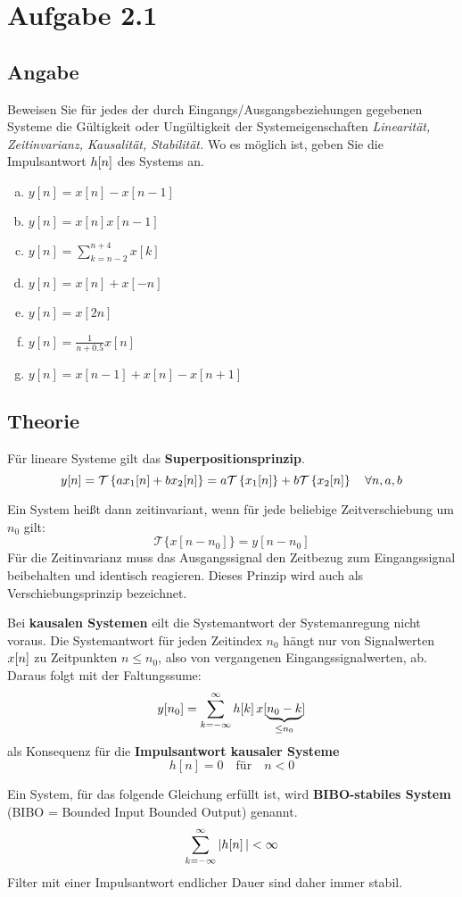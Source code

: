 \section*{Aufgabe 2.1}
\subsection*{Angabe}
Beweisen Sie für jedes der durch Eingangs/Ausgangsbeziehungen gegebenen Systeme die Gültigkeit oder Ungültigkeit der Systemeigenschaften \textit{Linearität, Zeitinvarianz, Kausalität, Stabilität.} Wo es möglich ist, geben Sie die Impulsantwort $h\negthinspace\left[n\right]$ des Systems an.
\begin{enumerate}[a)]
	\item $y[n] = x[n]-x[n-1]$
	\item $y[n] = x[n]x[n-1]$
	\item $\displaystyle{y[n] = \sum_{k=n-2}^{n+4}x[k]}$
	\item $y[n] = x[n] + x[-n]$
	\item $y[n] = x[2n]$
	\item $y[n] = \frac{1}{n+0.5}x[n]$
	\item $y[n] = x[n-1]+x[n]-x[n+1]$
\end{enumerate}
\subsection*{Theorie}
\begin{hint}
	Für lineare Systeme gilt das \textbf{Superpositionsprinzip}.\\
	\[
		y\negthinspace\left[n\right] = \mathcal{T} \left\{ ax_1 \negthinspace\left[n\right] + bx_2 \negthinspace\left[n\right] \right\}
		= a\mathcal{T} \left\{ x_1\negthinspace\left[n\right] \right\} + b\mathcal{T} \left\{ x_2 \negthinspace\left[n\right] \right\}
		\quad \forall n,a,b
	\]
\end{hint}
\begin{hint}
	Ein System heißt dann zeitinvariant, wenn für jede beliebige Zeitverschiebung um $n_0$ gilt:
	\[
		\mathcal{T}\{x[n-n_0]\} = y[n-n_0]
	\]
	Für die Zeitinvarianz muss das Ausgangssignal den Zeitbezug zum Eingangssignal beibehalten und identisch reagieren. Dieses Prinzip wird auch als Verschiebungsprinzip bezeichnet.
\end{hint}
\begin{hint}
	Bei \textbf{kausalen Systemen} eilt die Systemantwort der Systemanregung nicht voraus. Die Systemantwort für jeden Zeitindex $n_0$ hängt nur von Signalwerten $x\negthinspace\left[n\right]$ zu Zeitpunkten $n\le n_0$, also von vergangenen Eingangssignalwerten, ab. \\
	Daraus folgt mit der Faltungssume:
	\[
		y\negthinspace\left[n_0\right] = \sum_{k=-\infty}^{\infty} h\negthinspace\left[k\right]x[\underbrace{n_0-k}_{\le n_0}]
	\]
	als Konsequenz für die \textbf{Impulsantwort kausaler Systeme}
	\[
		h[n] = 0 \quad \text{für} \quad n < 0
	\]
\end{hint} \clearpage
\begin{hint}
	Ein System, für das folgende Gleichung erfüllt ist, wird \textbf{BIBO-stabiles System} (BIBO = Bounded Input Bounded Output) genannt.
	\[
		\sum_{k=-\infty}^{\infty}|h\negthinspace\left[n\right]|<\infty
	\]
	Filter mit einer Impulsantwort endlicher Dauer sind daher immer stabil.
\end{hint}
